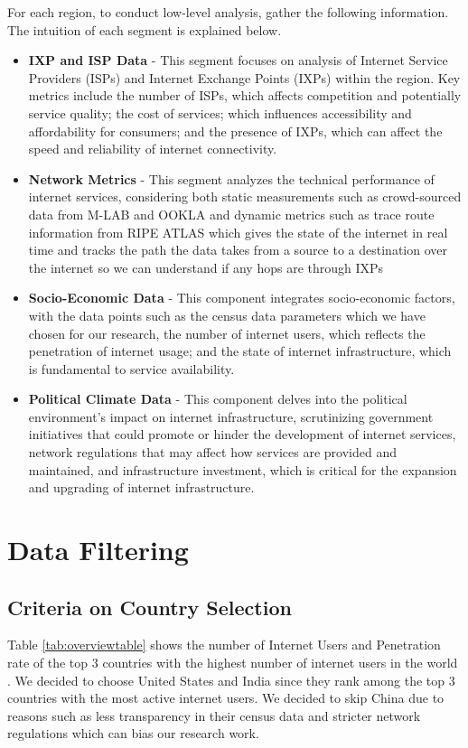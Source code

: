 \documentclass[conference]{IEEEtran}
\begin{document}
For each region, to conduct low-level analysis, gather the following information. The intuition of each segment is explained below.
\begin{itemize}
    \item \textbf{IXP and ISP Data} - This segment focuses on analysis of Internet Service Providers (ISPs) and Internet Exchange Points (IXPs) within the region. Key metrics include the number of ISPs, which affects competition and potentially service quality; the cost of services; which influences accessibility and affordability for consumers; and the presence of IXPs, which can affect the speed and reliability of internet connectivity.
    \item \textbf{Network Metrics} - This segment analyzes the technical performance of internet services, considering both static measurements such as crowd-sourced data from M-LAB and OOKLA and dynamic metrics such as trace route information from RIPE ATLAS which gives the state of the internet in real time and tracks the path the data takes from a source to a destination over the internet so we can understand if any hops are through IXPs
    \item \textbf{Socio-Economic Data} - This component integrates socio-economic factors, with the data points such as the census data parameters which we have chosen for our research, the number of internet users, which reflects the penetration of internet usage; and the state of internet infrastructure, which is fundamental to service availability.
    \item \textbf{Political Climate Data} - This component delves into the political environment's impact on internet infrastructure, scrutinizing government initiatives that could promote or hinder the development of internet services, network regulations that may affect how services are provided and maintained, and infrastructure investment, which is critical for the expansion and upgrading of internet infrastructure.
\end{itemize}

\section{Data Filtering}

\subsection{Criteria on Country Selection}
Table \ref{tab:overviewtable} shows the number of Internet Users and Penetration rate of the top 3 countries with the highest number of internet users in the world \cite{18}. We decided to choose United States and India since they rank among the top 3 countries with the most active internet users. We decided to skip China due to reasons such as less transparency in their census data and stricter network regulations which can bias our research work.
\end{document}
